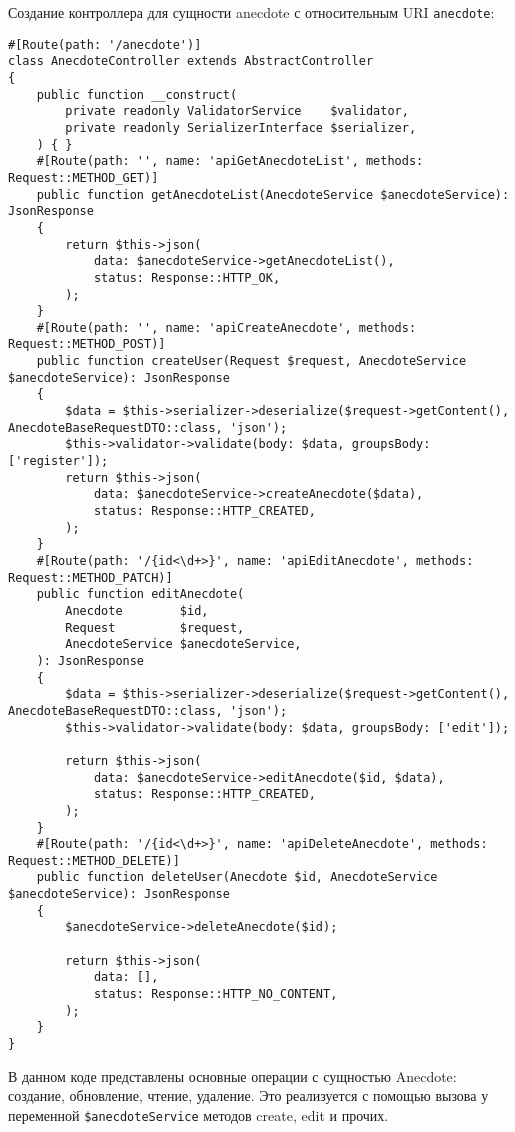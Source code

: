 \documentclass[pract]{SCWorks}
\begin{document}
Создание контроллера для сущности anecdote с относительным URI 
\texttt{\/anecdote}:

\begin{verbatim}
#[Route(path: '/anecdote')]
class AnecdoteController extends AbstractController
{
    public function __construct(
        private readonly ValidatorService    $validator,
        private readonly SerializerInterface $serializer,
    ) { }
    #[Route(path: '', name: 'apiGetAnecdoteList', methods: Request::METHOD_GET)]
    public function getAnecdoteList(AnecdoteService $anecdoteService): JsonResponse
    {
        return $this->json(
            data: $anecdoteService->getAnecdoteList(),
            status: Response::HTTP_OK,
        );
    }
    #[Route(path: '', name: 'apiCreateAnecdote', methods: Request::METHOD_POST)]
    public function createUser(Request $request, AnecdoteService $anecdoteService): JsonResponse
    {
        $data = $this->serializer->deserialize($request->getContent(), AnecdoteBaseRequestDTO::class, 'json');
        $this->validator->validate(body: $data, groupsBody: ['register']);
        return $this->json(
            data: $anecdoteService->createAnecdote($data),
            status: Response::HTTP_CREATED,
        );
    }
    #[Route(path: '/{id<\d+>}', name: 'apiEditAnecdote', methods: Request::METHOD_PATCH)]
    public function editAnecdote(
        Anecdote        $id,
        Request         $request,
        AnecdoteService $anecdoteService,
    ): JsonResponse
    {
        $data = $this->serializer->deserialize($request->getContent(), AnecdoteBaseRequestDTO::class, 'json');
        $this->validator->validate(body: $data, groupsBody: ['edit']);

        return $this->json(
            data: $anecdoteService->editAnecdote($id, $data),
            status: Response::HTTP_CREATED,
        );
    }
    #[Route(path: '/{id<\d+>}', name: 'apiDeleteAnecdote', methods: Request::METHOD_DELETE)]
    public function deleteUser(Anecdote $id, AnecdoteService $anecdoteService): JsonResponse
    {
        $anecdoteService->deleteAnecdote($id);

        return $this->json(
            data: [],
            status: Response::HTTP_NO_CONTENT,
        );
    }
}
\end{verbatim}

В данном коде представлены основные операции с сущностью Anecdote: создание,
обновление, чтение, удаление. Это реализуется с помощью вызова у переменной
\texttt{\$anecdoteService} методов create, edit и прочих.
\end{document}
